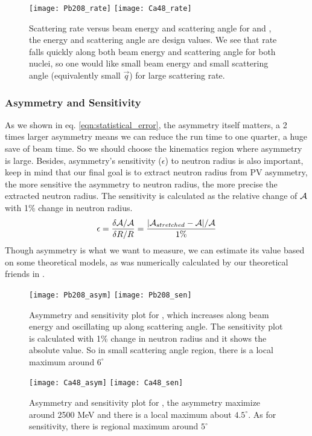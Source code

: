 \begin{figure}[h!]
    \texttt{[image: Pb208\_rate]}
    \texttt{[image: Ca48\_rate]}
    \caption{Scattering rate versus beam energy and scattering angle for \Pb and \Ca,
    the energy and scattering angle are design values.
    We see that rate falls quickly along both beam energy and scattering angle for
    both nuclei, so one would like small beam energy and small scattering angle (equivalently
    small $\vec{q}$) for large scattering rate.}
\end{figure}

\subsubsection{Asymmetry and Sensitivity}
As we shown in eq. \ref{eqn:statistical_error}, the asymmetry itself matters,
a 2 times larger asymmetry means we can reduce the run time to one quarter,
a huge save of beam time. So we should choose the kinematics region where
asymmetry is large. Besides, asymmetry's sensitivity ($\epsilon$) to neutron radius is
also important, keep in mind that our final goal is to extract neutron radius
from PV asymmetry, the more sensitive the asymmetry to neutron radius, the
more precise the extracted neutron radius. The sensitivity is calculated
as the relative change of $\mathcal{A}$ with 1\% change in neutron radius.
\begin{equation}
    \epsilon = \frac{\delta \mathcal{A}/\mathcal{A}}{\delta R/R} = \frac{|\mathcal{A}_{stretched} - \mathcal{A}|/\mathcal{A}}{1\%}
\end{equation}
Though asymmetry is what we want to measure, we can estimate its value based
on some theoretical models, as was numerically calculated by our theoretical 
friends in \cite{PhysRevC.57.3430}.
\begin{figure}[h!]
    \texttt{[image: Pb208\_asym]}
    \texttt{[image: Pb208\_sen]}
    \caption{Asymmetry and sensitivity plot for \Pb, which increases along beam 
    energy and oscillating up along scattering angle. The sensitivity plot is
    calculated with 1\% change in neutron radius and it shows the absolute value.
    So in small scattering angle region, there is a local maximum around $6^\circ$}
\end{figure}
\begin{figure}[h!]
    \texttt{[image: Ca48\_asym]}
    \texttt{[image: Ca48\_sen]}
    \caption{Asymmetry and sensitivity plot for \Ca, the asymmetry maximize around
    2500 MeV and there is a local maximum about $4.5^\circ$. As for sensitivity,
    there is regional maximum around $5^\circ$}
\end{figure}

